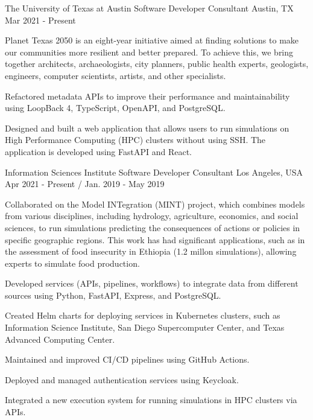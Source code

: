 \begin{cventries}

  \cventry
    {The University of Texas at Austin}
    {Software Developer Consultant}
    {Austin, TX}
    {Mar 2021 - Present}
    {
      \begin{cvitems}
        \item{Planet Texas 2050 is an eight-year initiative aimed at finding solutions to make our communities more resilient and better prepared. To achieve this, we bring together architects, archaeologists, city planners, public health experts, geologists, engineers, computer scientists, artists, and other specialists.}
        \item{Refactored metadata APIs to improve their performance and maintainability using LoopBack 4, TypeScript, OpenAPI, and PostgreSQL.}
        \item{Designed and built a web application that allows users to run simulations on High Performance Computing (HPC) clusters without using SSH. The application is developed using FastAPI and React.}
      \end{cvitems}
    }

  \cventry
    {Information Sciences Institute}
    {Software Developer Consultant}
    {Los Angeles, USA}
    {Apr 2021 - Present / Jan. 2019 - May 2019}
    {
      \begin{cvitems}
        \item{Collaborated on the Model INTegration (MINT) project, which combines models from various disciplines, including hydrology, agriculture, economics, and social sciences, to run simulations predicting the consequences of actions or policies in specific geographic regions. This work has had significant applications, such as in the assessment of food insecurity in Ethiopia (1.2 millon simulations), allowing experts to simulate food production.}
        \item{Developed services (APIs, pipelines, workflows) to integrate data from different sources using Python, FastAPI, Express, and PostgreSQL.}
        \item{Created Helm charts for deploying services in Kubernetes clusters, such as Information Science Institute, San Diego Supercomputer Center, and Texas Advanced Computing Center.}
        \item{Maintained and improved CI/CD pipelines using GitHub Actions.}
        \item{Deployed and managed authentication services using Keycloak.}
        \item{Integrated a new execution system for running simulations in HPC clusters via APIs.}
      \end{cvitems}
    }


\end{cventries}
